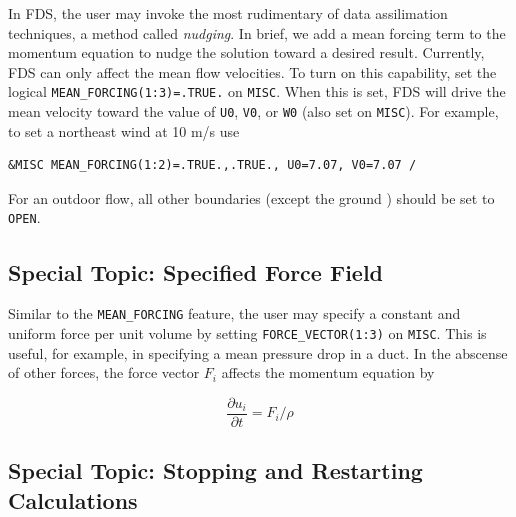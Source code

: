 \documentclass[11pt]{book}
\newcommand{\ct}{\tt\small}
\begin{document}
In FDS, the user may invoke the most rudimentary of data assilimation techniques, a method called \emph{nudging}.  In brief, we add a mean forcing term to the momentum equation to nudge the solution toward a desired result.  Currently, FDS can only affect the mean flow velocities.  To turn on this capability, set the logical {\ct MEAN\_FORCING(1:3)=.TRUE.} on {\ct MISC}.  When this is set, FDS will drive the mean velocity toward the value of {\ct U0}, {\ct V0}, or {\ct W0} (also set on {\ct MISC}).  For example, to set a northeast wind at 10 m/s use

\footnotesize
\begin{verbatim}
&MISC MEAN_FORCING(1:2)=.TRUE.,.TRUE., U0=7.07, V0=7.07 /
\end{verbatim}
\normalsize

\noindent For an outdoor flow, all other boundaries (except the ground ) should be set to {\ct OPEN}.

\subsection{Special Topic: Specified Force Field}
\label{info:force_vector}

Similar to the {\ct MEAN\_FORCING} feature, the user may specify a constant and uniform force per unit volume by setting {\ct FORCE\_VECTOR(1:3)} on {\ct MISC}.  This is useful, for example, in specifying a mean pressure drop in a duct.  In the abscense of other forces, the force vector $F_i$ affects the momentum equation by

\begin{equation}
\frac{\partial u_i}{\partial t} = F_i/\rho
\end{equation}

\subsection{Special Topic: Stopping and Restarting Calculations}
\label{info:restart}
\end{document}
